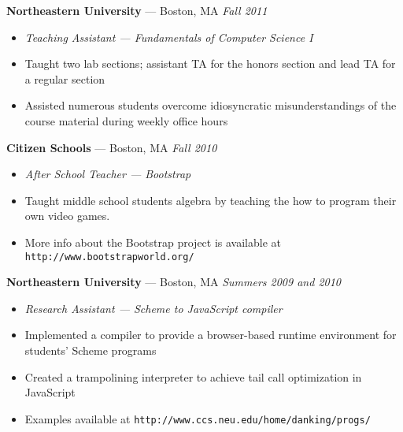 \documentclass[10pt]{letter}
\begin{document}
\begin{tabbing}
{\large \bf Northeastern University} --- Boston, MA \` \textit{Fall 2011}

\end{tabbing}
\begin{itemize}
\setlength\itemsep{1pt}
\item [] \textit{Teaching Assistant --- Fundamentals of Computer Science I}
\item{Taught two lab sections; assistant TA for the honors section and lead TA
  for a regular section}
\item{Assisted numerous students overcome idiosyncratic misunderstandings of the
  course material during weekly office hours}

\end{itemize}

\begin{tabbing}
{\large \bf Citizen Schools} --- Boston, MA \` \textit{Fall 2010}

\end{tabbing}
\begin{itemize}
\setlength\itemsep{1pt}
\item [] \textit{After School Teacher --- Bootstrap}
\item{Taught middle school students algebra by teaching the how to program their
  own video games.}
\item{More info about the Bootstrap project is available at \texttt{http://www.bootstrapworld.org/}}

\end{itemize}

\begin{tabbing}
{\large \bf Northeastern University} --- Boston, MA \` \textit{Summers 2009 and
  2010}

\end{tabbing}
\begin{itemize}
\setlength\itemsep{1pt}
\item [] \textit{Research Assistant --- Scheme to JavaScript compiler}
\item{Implemented a compiler to provide a browser-based runtime environment for
  students' Scheme programs}
\item{Created a trampolining interpreter to achieve tail call optimization in
  JavaScript}
\item{Examples available at \texttt{http://www.ccs.neu.edu/home/danking/progs/}}

\end{itemize}
\end{document}
